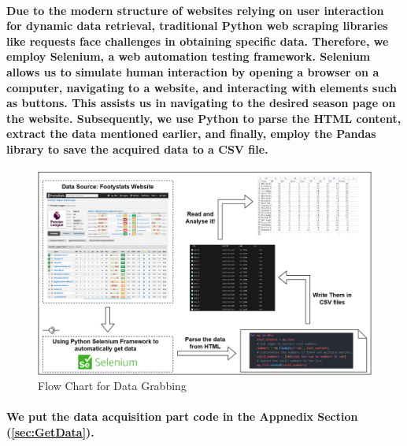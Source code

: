 \paragraph{Due to the modern structure of websites relying on user interaction for dynamic data retrieval, traditional Python web scraping libraries like requests face challenges in obtaining specific data. Therefore, we employ Selenium, a web automation testing framework. Selenium allows us to simulate human interaction by opening a browser on a computer, navigating to a website, and interacting with elements such as buttons. This assists us in navigating to the desired season page on the website. Subsequently, we use Python to parse the HTML content, extract the data mentioned earlier, and finally, employ the Pandas library to save the acquired data to a CSV file.}
% 
% 
% 
% 
\begin{figure}[H]
    \includegraphics[width=\textwidth]{pic/DataGrab.png}
    \caption{Flow Chart for Data Grabbing}
\end{figure}
% 
% 
% 
\paragraph{We put the data acquisition part code in the Appnedix Section (\ref{sec:GetData}).}
% 
% 
% 
% 